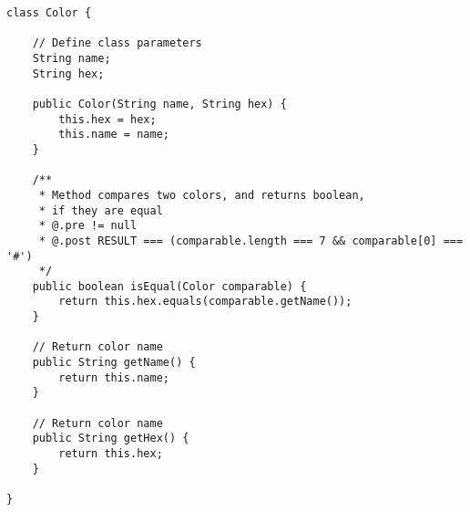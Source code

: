 \documentclass[a4paper,12pt,titlepage]{article}
\theoremstyle{definition}
\theoremstyle{remark}
\begin{document}
\begin{lstlisting}
class Color {

    // Define class parameters
    String name;
    String hex;

    public Color(String name, String hex) {
        this.hex = hex;
        this.name = name;
    }

    /**
     * Method compares two colors, and returns boolean,
     * if they are equal
     * @.pre != null
     * @.post RESULT === (comparable.length === 7 && comparable[0] === '#')
     */
    public boolean isEqual(Color comparable) {
        return this.hex.equals(comparable.getName());
    }

    // Return color name
    public String getName() {
        return this.name;
    }

    // Return color name
    public String getHex() {
        return this.hex;
    }

}

\end{lstlisting}
\end{document}
